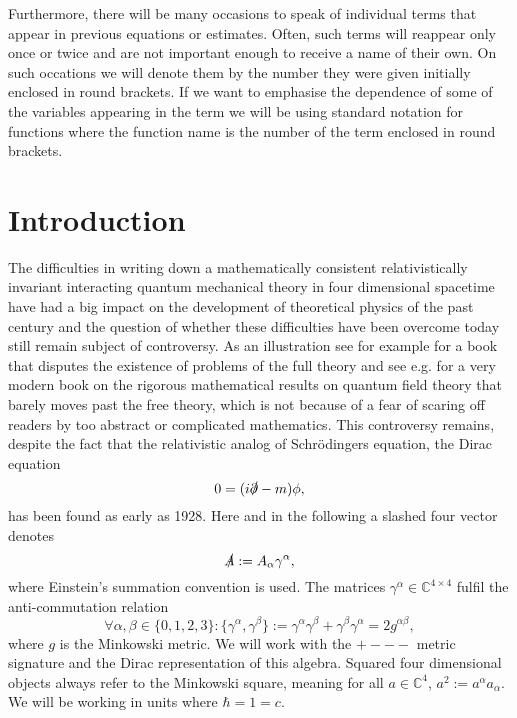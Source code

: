 \documentclass[b5paper,draft,openbib,12pt]{memoir}
\begin{document}
\vspace{0.5cm}
Furthermore, there will be many occasions to speak of 
individual terms that appear in previous equations or 
estimates. Often, such terms will reappear only once or 
twice and are not important enough to receive a name of 
their own. On such occations we will denote them 
by the number they were given initially enclosed 
in round brackets. If we want to emphasise 
the dependence of some of the variables appearing in 
the term we will be using standard notation for 
functions where the function name is the number 
of the term enclosed in round brackets.


\newpage 
\tableofcontents

\newpage



\mainmatter

\chapter{Introduction}

The difficulties in writing down a
mathematically consistent relativistically 
invariant interacting quantum mechanical theory in 
four dimensional spacetime have had a big impact 
on the development of theoretical physics of the 
past century and the question of whether these 
difficulties have been overcome today still remain 
subject of controversy. As an illustration see for example 
\cite{schwartz2014quantum} for a book that disputes 
the existence of problems of the full theory and 
see e.g. \cite{derezinski2013mathematics} for a 
very modern book on the rigorous mathematical 
results on quantum field theory that barely moves 
past the free theory, which is not 
because of a fear of scaring off readers by too 
abstract or complicated mathematics. 
This controversy remains, despite the 
fact that the relativistic analog of Schrödingers 
equation, the Dirac equation 
\begin{equation}\label{dirac free}
  0= (i\slashed{\partial}-m) \phi,
\end{equation}
has been found as early as 1928\cite{dirac1928quantum}.
Here and in the following a slashed four vector denotes 
\begin{equation}
  \slashed{A}:= A_\alpha \gamma^\alpha,
\end{equation}
where Einstein's summation convention is used. 
The matrices \(\gamma^\alpha \in \mathbb{C}^{4\times 4}\) 
fulfil the anti-commutation relation
\begin{equation}
\forall \alpha, \beta \in \{0,1,2,3\}:\{\gamma^\alpha, \gamma^\beta\}:= \gamma^\alpha \gamma^\beta+ \gamma^\beta \gamma^\alpha= 2g^{\alpha \beta},
\end{equation}
where \(g\) is the Minkowski metric. We will work with 
the \(+---\) 
metric signature and the Dirac representation of this 
algebra. Squared four dimensional objects always refer to 
the Minkowski square, meaning for all 
\(a\in \mathbb{C}^4\), \(a^2:= a^{\alpha} a_{\alpha}\). 
We will be working in units where \(\hbar=1=c\).
\end{document}
